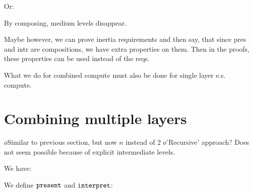 Or:


By composing, medium levels disappear.


Maybe however, we can prove inertia requirements and then say, that since pres and intr are compositions, we have extra properties on them. Then in the proofs, these properties can be used instead of the reqs. 

What we do for combined compute must also be done for single layer e.s. compute.


\bc
%																
%																
%																
\section{Combining multiple layers}

\bl
\o Similar to previous section, but now $n$ instead of 2
\o 'Recursive' approach? Does not seem possible because of explicit intermediate levels.
\el

We have:


We define ${\tt present}$ and ${\tt interpret}$:



